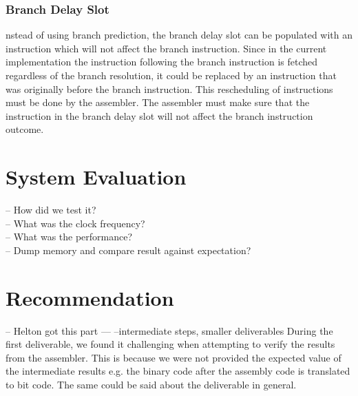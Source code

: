 \documentclass[conference]{IEEEtran}
\begin{document}
\subsubsection{Branch Delay Slot}
nstead of using branch prediction, the branch delay slot can be populated with an instruction which will not affect the branch instruction. Since in the current implementation the instruction following the branch instruction is fetched regardless of the branch resolution, it could be replaced by an instruction that was originally before the branch instruction. This rescheduling of instructions must be done by the assembler. The assembler must make sure that the instruction in the branch delay slot will not affect the branch instruction outcome. 

\section{System Evaluation}

\noindent
-- How did we test it?\\
-- What was the clock frequency?\\
-- What was the performance?\\
-- Dump memory and compare result against expectation?

\section{Recommendation}

	-- Helton got this part ---
--intermediate steps, smaller deliverables
During the first deliverable, we found it challenging when attempting to verify the results from the assembler. This is because we were not provided the expected value of the intermediate results e.g. the binary code after the assembly code is translated to bit code. The same could be said about the deliverable in general. 


%
%
\end{document}

